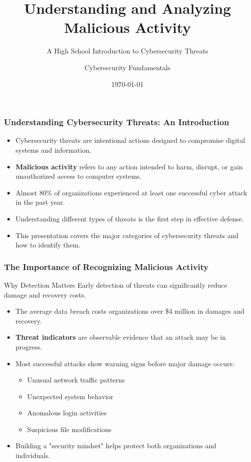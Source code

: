 \documentclass{beamer}
\title{Understanding and Analyzing Malicious Activity}
\subtitle{A High School Introduction to Cybersecurity Threats}
\author{Cybersecurity Fundamentals}
\date{\today}
\begin{document}
\begin{frame}
    \titlepage
\end{frame}

\begin{frame}
    \frametitle{Understanding Cybersecurity Threats: An Introduction}
    
    \begin{itemize}
        \item Cybersecurity threats are intentional actions designed to compromise digital systems and information.
        \item \textbf{Malicious activity} refers to any action intended to harm, disrupt, or gain unauthorized access to computer systems.
        \item Almost 80\% of organizations experienced at least one successful cyber attack in the past year.
        \item Understanding different types of threats is the first step in effective defense.
        \item This presentation covers the major categories of cybersecurity threats and how to identify them.
    \end{itemize}
\end{frame}

\begin{frame}
    \frametitle{The Importance of Recognizing Malicious Activity}
    
    \begin{alertblock}{Why Detection Matters}
        Early detection of threats can significantly reduce damage and recovery costs.
    \end{alertblock}
    
    \begin{itemize}
        \item The average data breach costs organizations over \$4 million in damages and recovery.
        \item \textbf{Threat indicators} are observable evidence that an attack may be in progress.
        \item Most successful attacks show warning signs before major damage occurs:
            \begin{itemize}
                \item Unusual network traffic patterns
                \item Unexpected system behavior
                \item Anomalous login activities
                \item Suspicious file modifications
            \end{itemize}
        \item Building a "security mindset" helps protect both organizations and individuals.
    \end{itemize}
\end{frame}
\end{document}
